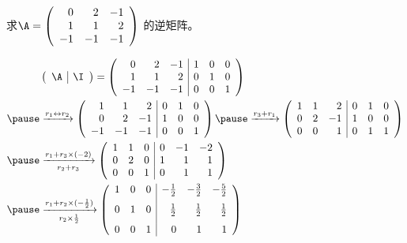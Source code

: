 \begin{frame}\ft{\secname}
\begin{li}
  求$
  \A=\left(
    \begin{array}{rrr}
      0&2&-1\\
      1&1&2\\
      -1&-1&-1
    \end{array}
  \right)
  $
  的逆矩阵。
\end{li}
\end{frame}


\begin{frame}\ft{\secname}
\begin{jie}

$$
\begin{aligned}
&\left(
  \begin{array}{c|c}
    \A & \I
  \end{array}
\right)=\left(
  \begin{array}{rrr|rrr}
    0 &  2 & -1 &  1 & 0 & 0\\
    1 &  1 &  2 &  0 & 1 & 0\\
    -1 & -1 & -1 &  0 & 0 & 1\\              
  \end{array}
\right) \\ \pause
&\xrightarrow[]{r_1\leftrightarrow r_2}\left(
  \begin{array}{rrr|rrr}
    1 &  1 &  2 &  0 & 1 & 0\\
    0 &  2 & -1 &  1 & 0 & 0\\
    -1 & -1 & -1 &  0 & 0 & 1\\          
  \end{array}
\right) \pause
\xrightarrow[]{r_3+ r_1}\left(
  \begin{array}{rrr|rrr}
    1 &  1 &  2 & 0 & 1 & 0\\
    0 &  2 & -1 & 1 & 0 & 0\\
    0 &  0 &  1 & 0 & 1 & 1\\          
  \end{array}
\right)\\\pause
&\xrightarrow[r_2+r_3]{r_1+ r_3\times(-2)}\left(
  \begin{array}{rrr|rrr}
    1 &  1 &  0  & 0 &-1 &-2\\
    0 &  2 &  0  & 1 & 1 & 1\\
    0 &  0 &  1  & 0 & 1 & 1\\    
  \end{array}
\right)\\\pause
&\xrightarrow[r_2\times \frac12]{r_1+ r_2\times(-\frac12)}\left(
  \begin{array}{rrr|rrr}
    1 &  0 &  0  & -\frac12 &-\frac32 &-\frac52\\[.1in]
    0 &  1 &  0  & \frac12 & \frac12 & \frac12 \\[.1in]
    0 &  0 &  1  & 0 & 1 & 1                   
  \end{array}
\right)    
\end{aligned}
$$
\end{jie}
\end{frame}


